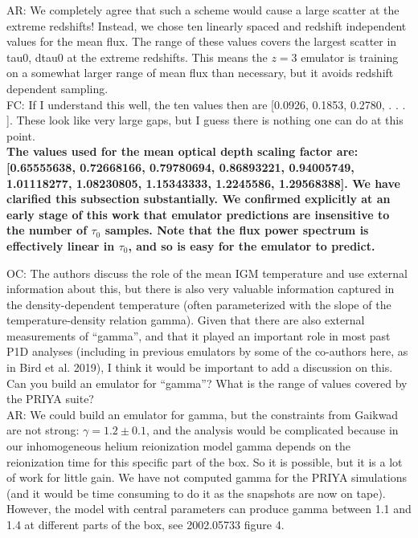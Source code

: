 \documentclass[12pt]{article}
\begin{document}
AR: We completely agree that such a scheme would cause a large scatter at the extreme redshifts! Instead, we chose ten linearly spaced and redshift independent values for the mean flux. The range of these values covers the largest scatter in tau0, dtau0 at the extreme redshifts. This means the $z=3$ emulator is training on a somewhat larger range of mean flux than necessary, but it avoids redshift dependent sampling.\\

FC: If I understand this well, the ten values then are [0.0926, 0.1853, 0.2780, . . . ]. These look like very large gaps, but I guess there is nothing one can do at this point.\\

\textbf{The values used for the mean optical depth scaling factor are: [0.65555638, 0.72668166, 0.79780694, 0.86893221, 0.94005749, 1.01118277, 1.08230805, 1.15343333, 1.2245586, 1.29568388]. We have clarified this subsection substantially. We confirmed explicitly at an early stage of this work that emulator predictions are insensitive to the number of $\tau_0$ samples. Note that the flux power spectrum is effectively linear in $\tau_0$, and so is easy for the emulator to predict. }\\

\hrulefill \newline

OC: The authors discuss the role of the mean IGM temperature and use external information about this, but there is also very valuable information captured in the density-dependent temperature (often parameterized with the slope of the temperature-density relation gamma). Given that there are also external measurements of “gamma”, and that it played an important role in most past P1D analyses (including in previous emulators by some of the co-authors here, as in Bird et al. 2019), I think it would be important to add a discussion on this. Can you build an emulator for “gamma”? What is the range of values covered by the PRIYA suite?\\

AR: We could build an emulator for gamma, but the constraints from Gaikwad are not strong: $\gamma = 1.2\pm 0.1$, and the analysis would be complicated because in our inhomogeneous helium reionization model gamma depends on the reionization time for this specific part of the box. So it is possible, but it is a lot of work for little gain. We have not computed gamma for the PRIYA simulations (and it would be time consuming to do it as the snapshots are now on tape). However, the model with central parameters can produce gamma between 1.1 and 1.4 at different parts of the box, see 2002.05733 figure 4.\\
\end{document}
